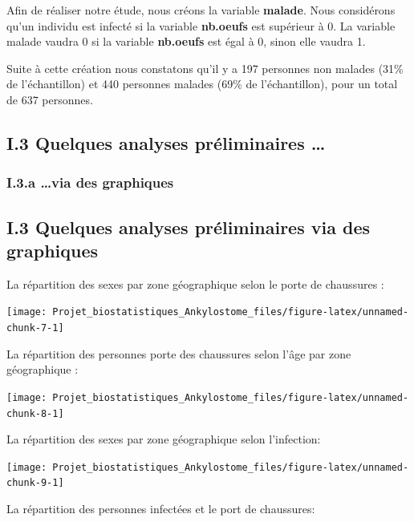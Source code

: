 \documentclass[
]{article}
\begin{document}
Afin de réaliser notre étude, nous créons la variable \textbf{malade}.
Nous considérons qu'un individu est infecté si la variable
\textbf{nb.oeufs} est supérieur à 0. La variable malade vaudra 0 si la
variable \textbf{nb.oeufs} est égal à 0, sinon elle vaudra 1.

Suite à cette création nous constatons qu'il y a 197 personnes non
malades (31\% de l'échantillon) et 440 personnes malades (69\% de
l'échantillon), pour un total de 637 personnes.

\subsection{I.3 Quelques analyses préliminaires
\ldots{}}\label{i.3-quelques-analyses-pruxe9liminaires}

\subsubsection{I.3.a \ldots via des
graphiques}\label{i.3.a-via-des-graphiques}

\subsection{I.3 Quelques analyses préliminaires via des
graphiques}\label{i.3-quelques-analyses-pruxe9liminaires-via-des-graphiques}

La répartition des sexes par zone géographique selon le porte de
chaussures :

\begin{center}\texttt{[image: Projet\_biostatistiques\_Ankylostome\_files/figure-latex/unnamed-chunk-7-1]} \end{center}

La répartition des personnes porte des chaussures selon l'âge par zone
géographique :

\begin{center}\texttt{[image: Projet\_biostatistiques\_Ankylostome\_files/figure-latex/unnamed-chunk-8-1]} \end{center}

La répartition des sexes par zone géographique selon l'infection:

\begin{center}\texttt{[image: Projet\_biostatistiques\_Ankylostome\_files/figure-latex/unnamed-chunk-9-1]} \end{center}

La répartition des personnes infectées et le port de chaussures:
\end{document}
